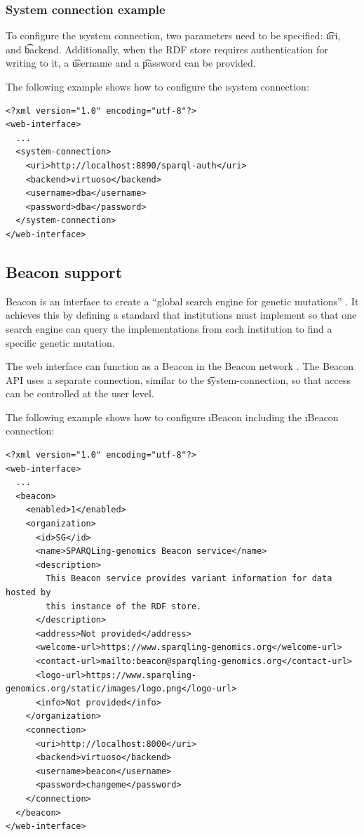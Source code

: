 \subsubsection{System connection example}

  To configure the \i{system connection}, two parameters need to be
  specified: \t{uri}, and \t{backend}.  Additionally, when the
  RDF store requires authentication for writing to it, a \t{username}
  and a \t{password} can be provided.

  The following example shows how to configure the \i{system connection}:

\begin{siderules}
\begin{verbatim}
<?xml version="1.0" encoding="utf-8"?>
<web-interface>
  ...
  <system-connection>
    <uri>http://localhost:8890/sparql-auth</uri>
    <backend>virtuoso</backend>
    <username>dba</username>
    <password>dba</password>
  </system-connection>
</web-interface>
\end{verbatim}
\end{siderules}

\subsection{Beacon support}
\label{sec:beacon}

  Beacon is an interface to create a ``global search engine for genetic
  mutations'' \citep{beacon-network}.  It achieves this by defining a
  standard that institutions must implement so that one search engine can
  query the implementations from each institution to find a specific
  genetic mutation.

  The web interface can function as a Beacon in the Beacon network
  \citep{beacon-network}.  The Beacon API uses a separate connection,
  similar to the \t{system-connection}, so that access can be
  controlled at the user level.

  The following example shows how to configure \i{Beacon} including the
  \i{Beacon connection}:

\begin{siderules}
\begin{verbatim}
<?xml version="1.0" encoding="utf-8"?>
<web-interface>
  ...
  <beacon>
    <enabled>1</enabled>
    <organization>
      <id>SG</id>
      <name>SPARQLing-genomics Beacon service</name>
      <description>
        This Beacon service provides variant information for data hosted by
        this instance of the RDF store.
      </description>
      <address>Not provided</address>
      <welcome-url>https://www.sparqling-genomics.org</welcome-url>
      <contact-url>mailto:beacon@sparqling-genomics.org</contact-url>
      <logo-url>https://www.sparqling-genomics.org/static/images/logo.png</logo-url>
      <info>Not provided</info>
    </organization>
    <connection>
      <uri>http://localhost:8000</uri>
      <backend>virtuoso</backend>
      <username>beacon</username>
      <password>changeme</password>
    </connection>
  </beacon>
</web-interface>
\end{verbatim}
\end{siderules}

